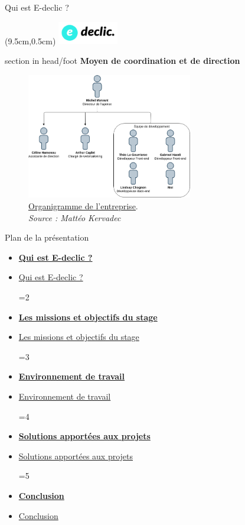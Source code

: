 \documentclass{beamer}
\newcommand{\logoEdeclic}{
	\begin{textblock*}{2cm}(9.5cm,0.5cm)
  		\includegraphics[height=1cm]{../img/logo_e-declic.png}
	\end{textblock*}
}
\newcommand{\planLine}[4]{
  \ifnum#1=#2
    \item \hyperlink{#3}{\textbf{\large #4}}
  \else
    \item \hyperlink{#3}{#4}
  \fi
}
\newcommand{\planSlide}[1]{
  	\begin{frame}{Plan de la présentation}
  		\begin{center}
  			\begin{minipage}{1\textwidth}
				\begin{itemize}
      			\planLine{#1}{1}{organisation}{Qui est E-declic ?}
      			\planLine{#1}{2}{sujet}{Les missions et objectifs du stage}
      			\planLine{#1}{3}{environnement}{Environnement de travail}
      			\planLine{#1}{4}{realisation}{Solutions apportées aux projets}
      			\planLine{#1}{5}{conclusion}{Conclusion}
	    		\end{itemize}
  		\end{minipage}
	\end{center}
	\vfill
	\end{frame}
}
\begin{document}
\begin{frame}{Qui est E-declic ?}
	\logoEdeclic
	
	\begin{beamercolorbox}[wd=\paperwidth,ht=1.5em,dp=0.5em,leftskip=0.5cm]{section in head/foot}
  		\large \textbf{Moyen de coordination et de direction}
	\end{beamercolorbox}
	\vspace{0.5em}
	\begin{center}
  		\begin{minipage}{0.9\textwidth}
			\begin{figure}[t]
  				\includegraphics[height=5.5cm]{../img/coordination.png}
  				\caption{
					\centering    					
    					\href{https://www.e-declic.com/agence-web/equipe/}{\underline{Organigramme de l'entreprise}}.\\
    					\textit{Source : Mattéo Kervadec}
  				}
  				\label{fig:coordination}
  			\end{figure}
  		\end{minipage}
	\end{center}
	\vfill
\end{frame}

\planSlide{2}
\end{document}

